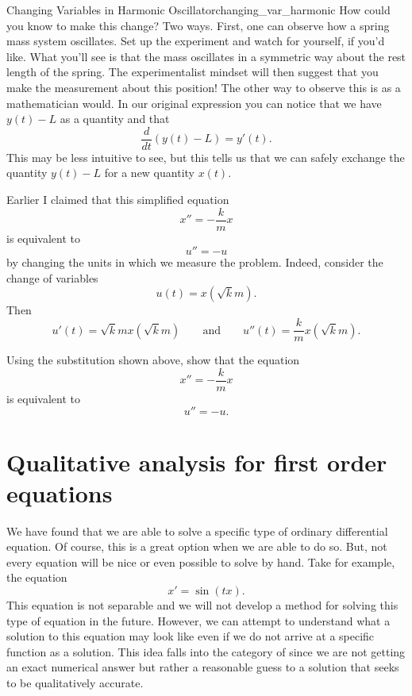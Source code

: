 \begin{ex}{Changing Variables in Harmonic Oscillator}{changing_var_harmonic}
        How could you know to make this change? Two ways.  First, one can observe how a spring mass system oscillates.  Set up the experiment and watch for yourself, if you'd like.  What you'll see is that the mass oscillates in a symmetric way about the rest length of the spring. The experimentalist mindset will then suggest that you make the measurement about this position! The other way to observe this is as a mathematician would.  In our original expression you can notice that we have $y(t)-L$ as a quantity and that
        \[
        \frac{d}{dt} (y(t)-L) = y'(t).
        \]
        This may be less intuitive to see, but this tells us that we can safely exchange the quantity $y(t)-L$ for a new quantity $x(t).$
        \end{ex}

        Earlier I claimed that this simplified equation
        \[
        x'' = -\frac{k}{m}x
        \]
        is equivalent to
        \[
        u''=-u
        \]
        by changing the units in which we measure the problem.  Indeed, consider the change of variables
        \[
        u(t)=x\left( \sqrt{k}{m}\right).
        \]
        Then
        \[
        u'(t)=\sqrt{k}{m}x\left(\sqrt{k}{m}\right) \qquad \textrm{and} \qquad u''(t)=\frac{k}{m}x\left( \sqrt{k}{m}\right).
        \]

        \begin{exercise}
        Using the substitution shown above, show that the equation
        \[
        x'' = -\frac{k}{m}x
        \]
        is equivalent to
        \[
        u''=-u.
        \]
        \end{exercise}

        \section{Qualitative analysis for first order equations}

            We have found that we are able to solve a specific type of ordinary differential equation.  Of course, this is a great option when we are able to do so. But, not every equation will be nice or even possible to solve by hand.  Take for example, the equation
            \[
            x'=\sin(tx).
            \]
            This equation is not separable and we will not develop a method for solving this type of equation in the future. However, we can attempt to understand what a solution to this equation may look like even if we do not arrive at a specific function as a solution. This idea falls into the category of  since we are not getting an exact numerical answer but rather a reasonable guess to a solution that seeks to be qualitatively accurate.


